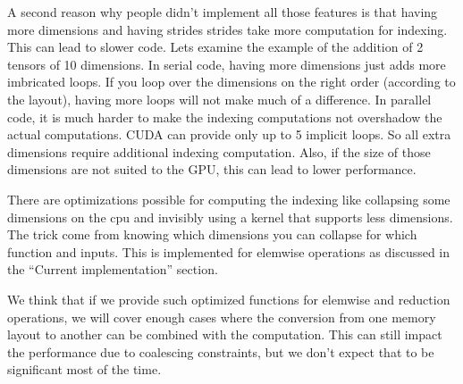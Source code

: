 \documentclass{article} %
\begin{document}
A second reason why people didn't implement all those features is
that having more dimensions and having strides strides take more
computation for indexing. This can lead to slower code. Lets examine the example of the addition of 2 tensors of 10 dimensions.
In serial code, having more dimensions just adds more imbricated loops.  
If you loop over the dimensions on the right order (according to the layout), having more loops will not make much of a difference.
In parallel code, it is much harder to make the indexing computations not overshadow the actual computations. 
CUDA can provide only up to 5 implicit loops. So all extra dimensions require
additional indexing computation. Also, if the size of those dimensions
are not suited to the GPU, this can lead to lower performance.

There are optimizations possible for computing the indexing like
collapsing some dimensions on the cpu and invisibly using a kernel
that supports less dimensions. The trick come from knowing which 
dimensions you can collapse for which function and inputs. This is
implemented for elemwise operations as discussed in the ``Current
implementation'' section.

We think that if we provide such optimized functions for elemwise and
reduction operations, we will cover enough cases where the conversion from
one memory layout to another can be combined with the computation. This
can still impact the performance due to coalescing constraints, but we
don't expect that to be significant most of the time.

\end{document}
